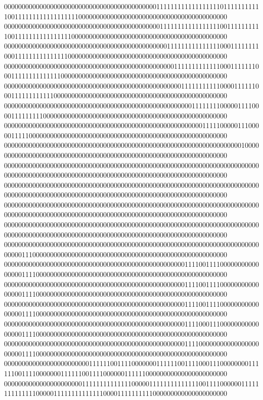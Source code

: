 000000000000000000000000000000000000000000011111111111111111101111111111100111111111111111111000000000000000000000000000000000000000000
000000000000000000000000000000000000000000001111111111111111100111111111100111111111111111100000000000000000000000000000000000000000000
000000000000000000000000000000000000000000000011111111111111100011111111000111111111111111000000000000000000000000000000000000000000000
000000000000000000000000000000000000000000000000111111111111100011111110001111111111111100000000000000000000000000000000000000000000000
000000000000000000000000000000000000000000000000001111111111100001111110001111111111110000000000000000000000000000000000000000000000000
000000000000000000000000000000000000000000000000000001111111100000111100001111111110000000000000000000000000000000000000000000000000000
000000000000000000000000000000000000000000000000000000001111100000111000001111100000000000000000000000000000000000000000000000000000000
000000000000000000000000000000000000000000000000000000000000000000010000000000000000000000000000000000000000000000000000000000000000000
000000000000000000000000000000000000000000000000000000000000000000000000000000000000000000000000000000000000000000000000000000000000000
000000000000000000000000000000000000000000000000000000000000000000000000000000000000000000000000000000000000000000000000000000000000000
000000000000000000000000000000000000000000000000000000000000000000000000000000000000000000000000000000000000000000000000000000000000000
000000000000000000000000000000000000000000000000000000000000000000000000000000000000000000000000000000000000000000000000000000000000000
000000000000000000000000000000000000000000000000000000000000000000000000000001110000000000000000000000000000000000000000000000000000000
000000000000000000000000000000000000000000000000000111100111100000000000000001111000000000000000000000000000000000000000000000000000000
000000000000000000000000000000000000000000000000000111100111100000000000000001111000000000000000000000000000000000000000000000000000000
000000000000000000000000000000000000000000000000000111100111100000000000000001111000000000000000000000000000000000000000000000000000000
000000000000000000000000000000000000000000000000000111100011100000000000000001111000000000000000000000000000000000000000000000000000000
000000000000000000000000000000000000000000000000000111100000000000000000000001111000000000000000000000000000000000000000000000000000000
000000000000000000000000111111001111000000011111100111100011100000000111111001111000000011111100111100000011111100000000000000000000000
000000000000000000000011111111111111000001111111111111100111100000011111111111111000001111111111111100001111111111000000000000000000000
